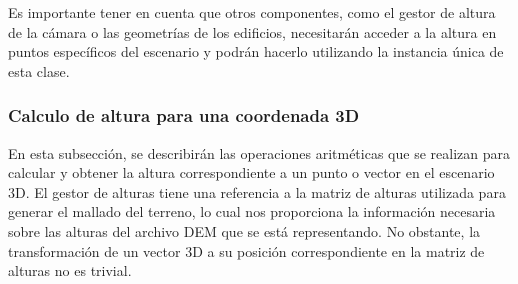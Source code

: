\documentclass[a4paper, 11pt]{book}
\begin{document}
Es importante tener en cuenta que otros componentes, como el gestor de altura de la cámara o las geometrías de los edificios, necesitarán acceder a la altura en puntos específicos del escenario y podrán hacerlo utilizando la instancia única de esta clase.
\subsubsection{Calculo de altura para una coordenada 3D}
\label{subsubsec:calculoAltura3D}
En esta subsección, se describirán las operaciones aritméticas que se realizan para calcular y obtener la altura correspondiente a un punto o vector en el escenario 3D. El gestor de alturas tiene una referencia a la matriz de alturas utilizada para generar el mallado del terreno, lo cual nos proporciona la información necesaria sobre las alturas del archivo DEM que se está representando. No obstante, la transformación de un vector 3D a su posición correspondiente en la matriz de alturas no es trivial.
\end{document}
